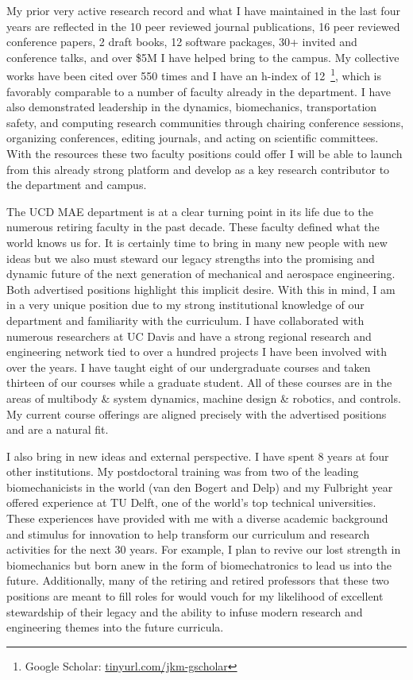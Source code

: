 \documentclass{letter}
\begin{document}
\begin{letter}
My prior very active research record and what I have maintained in the last
four years are reflected in the 10 peer reviewed journal publications, 16 peer
reviewed conference papers, 2 draft books, 12 software packages, 30+ invited
and conference talks, and over \$5M I have helped bring to the campus.  My
collective works have been cited over 550 times and I have an h-index of
12~\footnote{Google Scholar:
\href{http://tinyurl.com/jkm-gscholar}{tinyurl.com/jkm-gscholar}}, which is
favorably comparable to a number of faculty already in the department. I have
also demonstrated leadership in the dynamics, biomechanics, transportation
safety, and computing research communities through chairing conference
sessions, organizing conferences, editing journals, and acting on scientific
committees. With the resources these two faculty positions could offer I will
be able to launch from this already strong platform and develop as a key
research contributor to the department and campus.

The UCD MAE department is at a clear turning point in its life due to the
numerous retiring faculty in the past decade. These faculty defined what the
world knows us for. It is certainly time to bring in many new people with new
ideas but we also must steward our legacy strengths into the promising and
dynamic future of the next generation of mechanical and aerospace engineering.
Both advertised positions highlight this implicit desire. With this in mind, I
am in a very unique position due to my strong institutional knowledge of our
department and familiarity with the curriculum. I have collaborated with
numerous researchers at UC Davis and have a strong regional research and
engineering network tied to over a hundred projects I have been involved with
over the years. I have taught eight of our undergraduate courses and taken
thirteen of our courses while a graduate student. All of these courses are in
the areas of multibody \& system dynamics, machine design \& robotics, and
controls. My current course offerings are aligned precisely with the advertised
positions and are a natural fit.

I also bring in new ideas and external perspective. I have spent 8 years at
four other institutions. My postdoctoral training was from two of the leading
biomechanicists in the world (van den Bogert and Delp) and my Fulbright year
offered experience at TU Delft, one of the world's top technical universities.
These experiences have provided with me with a diverse academic background and
stimulus for innovation to help transform our curriculum and research
activities for the next 30 years.  For example, I plan to revive our lost
strength in biomechanics but born anew in the form of biomechatronics to lead
us into the future. Additionally, many of the retiring and retired professors
that these two positions are meant to fill roles for would vouch for my
likelihood of excellent stewardship of their legacy and the ability to infuse
modern research and engineering themes into the future curricula.


\end{letter}
\end{document}

